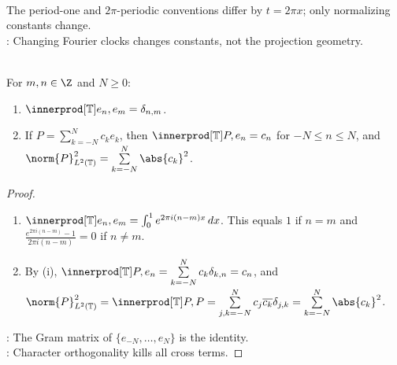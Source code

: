 \begin{perspective} \label{per:period-one-versus-two-pi-fourier} \\
The period-one and $2\pi$-periodic conventions differ by $t=2\pi x$; only normalizing constants change.\\
: Changing Fourier clocks changes constants, not the projection geometry.
\end{perspective}

\begin{proposition} \label{prop:period-one-characters-orthonormal} \\
For $m,n\in\Z$ and $N\geq0$:
\begin{enumerate}[label=(\roman*)]
\setlength{\itemsep}{0pt}
\item $\innerprod[\mathbb{T}]{e_n,e_m}=\delta_{n,m}$.
\item If $P=\sum\limits_{k=-N}^{N}c_ke_k$, then $\innerprod[\mathbb{T}]{P,e_n}=c_n$ for $-N\leq n\leq N$, and $\norm{P}_{L^2(\mathbb{T})}^2=\sum\limits_{k=-N}^{N}\abs{c_k}^2$.
\end{enumerate}
\begin{proof}
\begin{enumerate}[label=(\roman*)]
\setlength{\itemsep}{0pt}
\item $\innerprod[\mathbb{T}]{e_n,e_m}=\int_0^1e^{2\pi i(n-m)x}\,dx$. This equals $1$ if $n=m$ and $\frac{e^{2\pi i(n-m)}-1}{2\pi i(n-m)}=0$ if $n\neq m$.
\item By (i), $\innerprod[\mathbb{T}]{P,e_n}=\sum\limits_{k=-N}^{N}c_k\delta_{k,n}=c_n$, and $\norm{P}_{L^2(\mathbb{T})}^2=\innerprod[\mathbb{T}]{P,P}=\sum\limits_{j,k=-N}^{N}c_j\overline{c_k}\delta_{j,k}=\sum\limits_{k=-N}^{N}\abs{c_k}^2$.
\end{enumerate}
: The Gram matrix of $\{e_{-N},\ldots,e_N\}$ is the identity.\\
: Character orthogonality kills all cross terms.
\end{proof}
\end{proposition}
